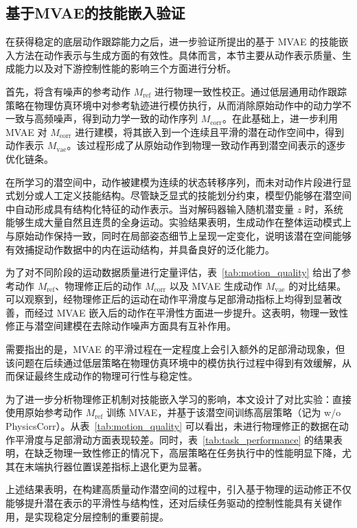 \subsection{基于MVAE的技能嵌入验证}

在获得稳定的底层动作跟踪能力之后，进一步验证所提出的基于 MVAE 的技能嵌入方法在动作表示与生成方面的有效性。具体而言，本节主要从动作表示质量、生成能力以及对下游控制性能的影响三个方面进行分析。

首先，将含有噪声的参考动作 $M_{\text{ref}}$ 进行物理一致性校正。通过低层通用动作跟踪策略在物理仿真环境中对参考轨迹进行模仿执行，从而消除原始动作中的动力学不一致与高频噪声，得到动力学一致的动作序列 $M_{\text{corr}}$。在此基础上，进一步利用 MVAE 对 $M_{\text{corr}}$ 进行建模，将其嵌入到一个连续且平滑的潜在动作空间中，得到动作表示 $M_{\text{vae}}$。该过程形成了从原始动作到物理一致动作再到潜空间表示的逐步优化链条。

在所学习的潜空间中，动作被建模为连续的状态转移序列，而未对动作片段进行显式划分或人工定义技能结构。尽管缺乏显式的技能划分约束，模型仍能够在潜空间中自动形成具有结构化特征的动作表示。当对解码器输入随机潜变量 $z$ 时，系统能够生成大量自然且连贯的全身运动。实验结果表明，生成动作在整体运动模式上与原始动作保持一致，同时在局部姿态细节上呈现一定变化，说明该潜在空间能够有效捕捉动作数据中的内在运动结构，并具备良好的泛化能力。

为了对不同阶段的运动数据质量进行定量评估，表~\ref{tab:motion_quality} 给出了参考动作 $M_{\text{ref}}$、物理修正后的动作 $M_{\text{corr}}$ 以及 MVAE 生成动作 $M_{\text{vae}}$ 的对比结果。可以观察到，经物理修正后的运动在动作平滑度与足部滑动指标上均得到显著改善，而经过 MVAE 嵌入后的动作在平滑性方面进一步提升。这表明，物理一致性修正与潜空间建模在去除动作噪声方面具有互补作用。

需要指出的是，MVAE 的平滑过程在一定程度上会引入额外的足部滑动现象，但该问题在后续通过低层策略在物理仿真环境中的模仿执行过程中得到有效缓解，从而保证最终生成动作的物理可行性与稳定性。

为了进一步分析物理修正机制对技能嵌入学习的影响，本文设计了对比实验：直接使用原始参考动作 $M_{\text{ref}}$ 训练 MVAE，并基于该潜空间训练高层策略（记为 w/o PhysicsCorr）。从表~\ref{tab:motion_quality} 可以看出，未进行物理修正的数据在动作平滑度与足部滑动方面表现较差。同时，表~\ref{tab:task_performance} 的结果表明，在缺乏物理一致性修正的情况下，高层策略在任务执行中的性能明显下降，尤其在末端执行器位置误差指标上退化更为显著。

上述结果表明，在构建高质量动作潜空间的过程中，引入基于物理的运动修正不仅能够提升潜在表示的平滑性与结构性，还对后续任务驱动的控制性能具有关键作用，是实现稳定分层控制的重要前提。


